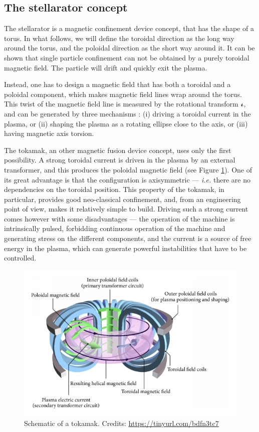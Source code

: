 \documentclass[my_thesis.tex]{subfiles}
\begin{document}
\subsection{The stellarator concept}
The stellarator is a magnetic confinement device concept, that has the shape of a torus. In what follows, we will define the toroidal direction as the long way around the torus, and the poloidal direction as the short way around it. It can be shown that single particle confinement can not be obtained by a purely toroidal magnetic field. The particle will drift and quickly exit the plasma. 

Instead, one has to design a magnetic field that has both a toroidal and a poloidal component, which makes magnetic field lines wrap around the torus. This twist of the magnetic field line is measured by the rotational transform $\text{$\iota\!\!$-}$, and can be generated by three mechanisms \citep{Helander2014}: (i) driving a toroidal current in the plasma, or (ii) shaping the plasma as a rotating ellipse close to the axis, or (iii) having magnetic axis torsion.

The tokamak, an other magnetic fusion device concept, uses only the first possibility. A strong toroidal current is driven in the plasma by an external transformer, and this produces the poloidal magnetic field (see Figure \ref{fig tokamak sketch}). One of its great advantage is that the configuration is axisymmetric --- \textit{i.e.} there are no dependencies on the toroidal position. This property of the tokamak, in particular, provides good neo-classical confinement, and, from an engineering point of view, makes it relatively simple to build. Driving such a strong current comes however with some disadvantages --- the operation of the machine is intrinsically pulsed, forbidding continuous operation of the machine and generating stress on the different components, and the current is a source of free energy in the plasma, which can generate powerful instabilities that have to be controlled.

\begin{figure}
    \centering
    \includegraphics[width=\linewidth]{images/introduction/TokamakSketch.jpg}
    \caption{Schematic of a tokamak. Credits: \url{https://tinyurl.com/bdfn3tc7}}
    \label{fig tokamak sketch}
\end{figure}
\end{document}
